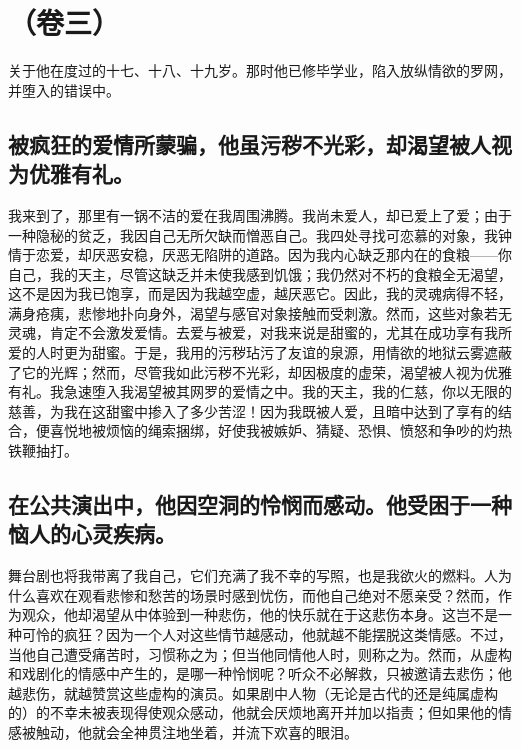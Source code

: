 \section{（卷三）}

关于他在度过的十七、十八、十九岁。那时他已修毕学业，陷入放纵情欲的罗网，并堕入的错误中。\par


\subsection{被疯狂的爱情所蒙骗，他虽污秽不光彩，却渴望被人视为优雅有礼。}

我来到了，那里有一锅不洁的爱在我周围沸腾。我尚未爱人，却已爱上了爱；由于一种隐秘的贫乏，我因自己无所欠缺而憎恶自己。我四处寻找可恋慕的对象，我钟情于恋爱，却厌恶安稳，厌恶无陷阱的道路。因为我内心缺乏那内在的食粮——你自己，我的天主，尽管这缺乏并未使我感到饥饿；我仍然对不朽的食粮全无渴望，这不是因为我已饱享，而是因为我越空虚，越厌恶它。因此，我的灵魂病得不轻，满身疮痍，悲惨地扑向身外，渴望与感官对象接触而受刺激。然而，这些对象若无灵魂，肯定不会激发爱情。去爱与被爱，对我来说是甜蜜的，尤其在成功享有我所爱的人时更为甜蜜。于是，我用的污秽玷污了友谊的泉源，用情欲的地狱云雾遮蔽了它的光辉；然而，尽管我如此污秽不光彩，却因极度的虚荣，渴望被人视为优雅有礼。我急速堕入我渴望被其网罗的爱情之中。我的天主，我的仁慈，你以无限的慈善，为我在这甜蜜中掺入了多少苦涩！因为我既被人爱，且暗中达到了享有的结合，便喜悦地被烦恼的绳索捆绑，好使我被嫉妒、猜疑、恐惧、愤怒和争吵的灼热铁鞭抽打。\par


\subsection{在公共演出中，他因空洞的怜悯而感动。他受困于一种恼人的心灵疾病。}

舞台剧也将我带离了我自己，它们充满了我不幸的写照，也是我欲火的燃料。人为什么喜欢在观看悲惨和愁苦的场景时感到忧伤，而他自己绝对不愿亲受？然而，作为观众，他却渴望从中体验到一种悲伤，他的快乐就在于这悲伤本身。这岂不是一种可怜的疯狂？因为一个人对这些情节越感动，他就越不能摆脱这类情感。不过，当他自己遭受痛苦时，习惯称之为；但当他同情他人时，则称之为。然而，从虚构和戏剧化的情感中产生的，是哪一种怜悯呢？听众不必解救，只被邀请去悲伤；他越悲伤，就越赞赏这些虚构的演员。如果剧中人物（无论是古代的还是纯属虚构的）的不幸未被表现得使观众感动，他就会厌烦地离开并加以指责；但如果他的情感被触动，他就会全神贯注地坐着，并流下欢喜的眼泪。\par

